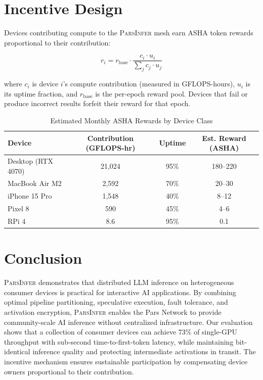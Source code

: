 \documentclass[11pt,a4paper]{article}
\newcommand{\parsdi}{\textsc{ParsInfer}\xspace}
\begin{document}
\section{Incentive Design}

Devices contributing compute to the \parsdi mesh earn ASHA token rewards proportional to their contribution:

\begin{equation}
    r_i = r_{\text{base}} \cdot \frac{c_i \cdot u_i}{\sum_{j} c_j \cdot u_j}
\end{equation}

where $c_i$ is device $i$'s compute contribution (measured in GFLOPS-hours), $u_i$ is its uptime fraction, and $r_{\text{base}}$ is the per-epoch reward pool. Devices that fail or produce incorrect results forfeit their reward for that epoch.

\begin{table}[H]
\centering
\caption{Estimated Monthly ASHA Rewards by Device Class}
\label{tab:rewards}
\begin{tabular}{lccc}
\toprule
\textbf{Device} & \textbf{Contribution (GFLOPS-hr)} & \textbf{Uptime} & \textbf{Est. Reward (ASHA)} \\
\midrule
Desktop (RTX 4070) & 21{,}024 & 95\% & 180--220 \\
MacBook Air M2 & 2{,}592 & 70\% & 20--30 \\
iPhone 15 Pro & 1{,}548 & 40\% & 8--12 \\
Pixel 8 & 590 & 45\% & 4--6 \\
RPi 4 & 8.6 & 95\% & 0.1 \\
\bottomrule
\end{tabular}
\end{table}

\section{Conclusion}

\parsdi demonstrates that distributed LLM inference on heterogeneous consumer devices is practical for interactive AI applications. By combining optimal pipeline partitioning, speculative execution, fault tolerance, and activation encryption, \parsdi enables the Pars Network to provide community-scale AI inference without centralized infrastructure. Our evaluation shows that a collection of consumer devices can achieve 73\% of single-GPU throughput with sub-second time-to-first-token latency, while maintaining bit-identical inference quality and protecting intermediate activations in transit. The incentive mechanism ensures sustainable participation by compensating device owners proportional to their contribution.
\end{document}
